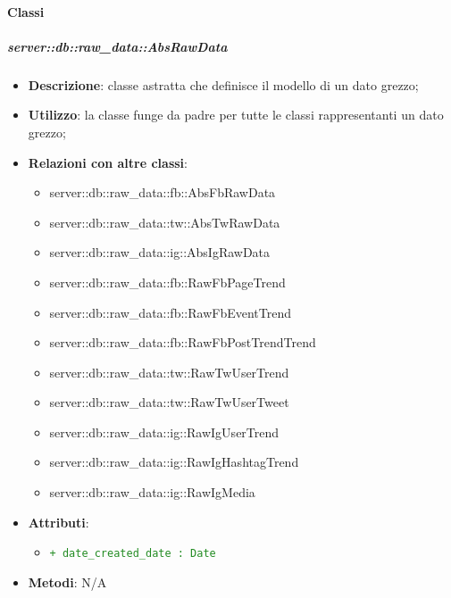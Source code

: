 	\paragraph{Classi} %
		\subparagraph{server::db::raw\_data::AbsRawData} %
		\label{subp:bdsm_app_server_raw_data_absrawdata}
			\begin{itemize}
				\item \textbf{Descrizione}: classe astratta che definisce il modello di un dato grezzo;
				\item \textbf{Utilizzo}: la classe funge da padre per tutte le classi rappresentanti un dato grezzo;
				\item \textbf{Relazioni con altre classi}:
					\begin{itemize}
						\item server::db::raw\_data::fb::AbsFbRawData
						\item server::db::raw\_data::tw::AbsTwRawData
						\item server::db::raw\_data::ig::AbsIgRawData
						\item server::db::raw\_data::fb::RawFbPageTrend
						\item server::db::raw\_data::fb::RawFbEventTrend
						\item server::db::raw\_data::fb::RawFbPostTrendTrend
						\item server::db::raw\_data::tw::RawTwUserTrend
						\item server::db::raw\_data::tw::RawTwUserTweet
						\item server::db::raw\_data::ig::RawIgUserTrend
						\item server::db::raw\_data::ig::RawIgHashtagTrend
						\item server::db::raw\_data::ig::RawIgMedia
					\end{itemize}
				\item \textbf{Attributi}:
					\begin{itemize}
						\item \textcolor{forestgreen}{\texttt{+ date\_created\_date : Date}}
					\end{itemize}
				\item \textbf{Metodi}: N/A
			\end{itemize}

